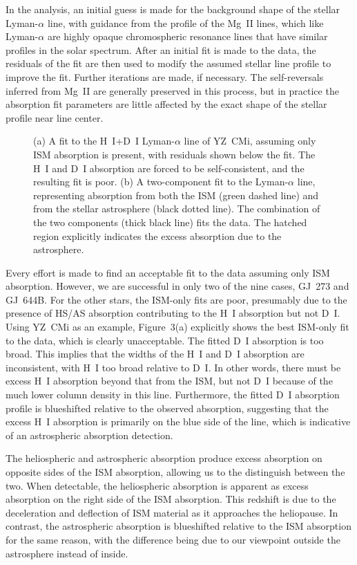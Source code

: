 \documentclass[preprint]{aastex}
\begin{document}
     In the analysis, an initial guess is
made for the background shape of the stellar Lyman-$\alpha$
line, with guidance from the profile of the Mg~II lines, which
like Lyman-$\alpha$ are highly opaque chromospheric resonance
lines that have similar profiles in the solar spectrum.  After
an initial fit is made to the data, the residuals of the fit
are then used to modify the assumed stellar line profile to
improve the fit.  Further iterations are made, if necessary.
The self-reversals inferred from Mg~II are generally preserved
in this process, but in practice the absorption fit parameters
are little affected by the exact shape of the stellar profile
near line center.

\begin{figure}[t]
\caption{(a) A fit to the H~I+D~I Lyman-$\alpha$ line of
  YZ~CMi, assuming only ISM absorption is present, with
  residuals shown below the fit.  The
  H~I and D~I absorption are forced to be self-consistent,
  and the resulting fit is poor.  (b) A two-component fit
  to the Lyman-$\alpha$ line, representing absorption from
  both the ISM (green dashed line) and from the stellar
  astrosphere (black dotted line).  The combination of
  the two components (thick black line) fits the data.
  The hatched region explicitly indicates the excess
  absorption due to the astrosphere.}
\end{figure}
     Every effort is made to find an acceptable fit to the
data assuming only ISM absorption.  However,
we are successful in only two of the nine cases, GJ~273 and
GJ~644B.  For the other stars, the ISM-only fits are poor,
presumably due to the presence of HS/AS absorption
contributing to the H~I absorption but not D~I.  Using YZ~CMi
as an example, Figure~3(a) explicitly shows the best ISM-only
fit to the data, which is clearly unacceptable.  The fitted
D~I absorption is too broad.  This implies that the widths of
the H~I and D~I absorption are inconsistent, with H~I too broad
relative to D~I.  In other words, there must be excess H~I
absorption beyond that from the ISM, but not D~I because of the
much lower column density in this line.
Furthermore, the fitted D~I absorption profile is blueshifted
relative to the observed absorption, suggesting that the
excess H~I absorption is primarily on the blue side of the line,
which is indicative of an astrospheric absorption detection.

     The heliospheric and astrospheric absorption
produce excess absorption on opposite sides of the ISM
absorption, allowing us to the distinguish between the two.
When detectable, the heliospheric absorption
is apparent as excess absorption on the right side of the
ISM absorption.  This redshift is due to the deceleration and
deflection of ISM material as it approaches the heliopause.
In contrast, the astrospheric absorption is blueshifted relative
to the ISM absorption for the same reason, with the difference
being due to our viewpoint outside the astrosphere instead
of inside.
\end{document}
